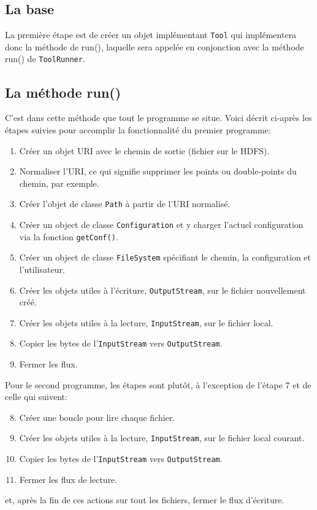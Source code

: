 \documentclass[a4paper]{article}
\begin{document}
\subsection{La base}
\label{sec:orgheadline9}
La première étape est de créer un objet implémentant \verb?Tool? qui implémentera donc la méthode de run(), laquelle sera appelée en conjonction avec la méthode run() de \verb?ToolRunner?.
\subsection{La méthode run()}
\label{sec:orgheadline10}
C'est dans cette méthode que tout le programme se situe.
Voici décrit ci-après les étapes suivies pour accomplir la fonctionnalité du premier programme:
\begin{enumerate}
\item Créer un objet URI avec le chemin de sortie (fichier sur le HDFS).
\item Normaliser l'URI, ce qui signifie supprimer les points ou double-points du chemin, par exemple.
\item Créer l'objet de classe \verb?Path? à partir de l'URI normalisé.
\item Créer un object de classe \verb?Configuration? et y charger l'actuel configuration via la fonction \verb?getConf()?.
\item Créer un object de classe \verb?FileSystem? spécifiant le chemin, la configuration et l'utilisateur.
\item Créer les objets utiles à l'écriture, \verb?OutputStream?, sur le fichier nouvellement créé.
\item Créer les objets utiles à la lecture, \verb?InputStream?, sur le fichier local.
\item Copier les bytes de l'\verb?InputStream? vers \verb?OutputStream?.
\item Fermer les flux.
\end{enumerate}

Pour le second programme, les étapes sont plutôt, à l'exception de l'étape 7 et de celle qui suivent:
\begin{enumerate}
\setcounter{enumi}{7}
\item Créer une boucle pour lire chaque fichier.
\item Créer les objets utiles à la lecture, \verb?InputStream?, sur le fichier local courant.
\item Copier les bytes de l'\verb?InputStream? vers \verb?OutputStream?.
\item Fermer les flux de lecture.
\end{enumerate}
et, après la fin de ces actions sur tout les fichiers, fermer le flux d'écriture.
\end{document}
